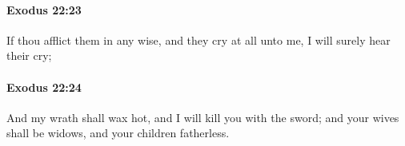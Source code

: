 		\paragraph{Exodus 22:23} %
			\label{EXODUS-22-23}

			If thou afflict them in any wise, and they cry at all unto me, I will surely hear their cry;


		\paragraph{Exodus 22:24} %
			\label{EXODUS-22-24}

			And my wrath shall wax hot, and I will kill you with the sword; and your wives shall be widows, and your children fatherless.


